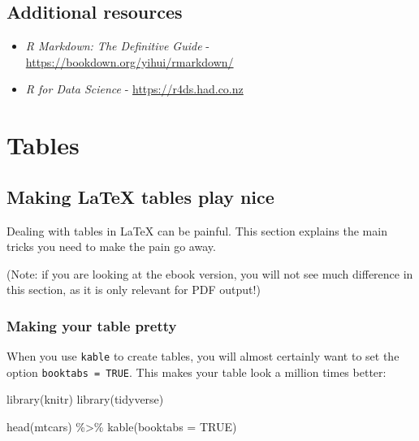 \documentclass[a4paper, nobind]{templates/ociamthesis}
\newenvironment{Shaded}{\begin{snugshade}}{\end{snugshade}}
\newcommand{\AttributeTok}[1]{\textcolor[rgb]{0.77,0.63,0.00}{#1}}
\newcommand{\ConstantTok}[1]{\textcolor[rgb]{0.00,0.00,0.00}{#1}}
\newcommand{\FunctionTok}[1]{\textcolor[rgb]{0.00,0.00,0.00}{#1}}
\newcommand{\NormalTok}[1]{#1}
\newcommand{\SpecialCharTok}[1]{\textcolor[rgb]{0.00,0.00,0.00}{#1}}
\renewenvironment{Shaded}
{
  \vspace{10pt}%
  \begin{snugshade}%
}{%
  \end{snugshade}%
  \vspace{8pt}%
}
\begin{document}
\hypertarget{additional-resources}{%
\section{Additional resources}\label{additional-resources}}

\begin{itemize}
\item
  \emph{R Markdown: The Definitive Guide} - \url{https://bookdown.org/yihui/rmarkdown/}
\item
  \emph{R for Data Science} - \url{https://r4ds.had.co.nz}
\end{itemize}

\hypertarget{tables}{%
\chapter{Tables}\label{tables}}

\minitoc 

\hypertarget{making-latex-tables-play-nice}{%
\section{Making LaTeX tables play nice}\label{making-latex-tables-play-nice}}

Dealing with tables in LaTeX can be painful.
This section explains the main tricks you need to make the pain go away.

(Note: if you are looking at the ebook version, you will not see much difference in this section, as it is only relevant for PDF output!)

\hypertarget{making-your-table-pretty}{%
\subsection{Making your table pretty}\label{making-your-table-pretty}}

When you use \texttt{kable} to create tables, you will almost certainly want to set the option \texttt{booktabs\ =\ TRUE}.
This makes your table look a million times better:

\begin{Shaded}
\begin{Highlighting}[]
\FunctionTok{library}\NormalTok{(knitr)}
\FunctionTok{library}\NormalTok{(tidyverse)}

\FunctionTok{head}\NormalTok{(mtcars) }\SpecialCharTok{\%\textgreater{}\%} 
  \FunctionTok{kable}\NormalTok{(}\AttributeTok{booktabs =} \ConstantTok{TRUE}\NormalTok{)}
\end{Highlighting}
\end{Shaded}
\end{document}
